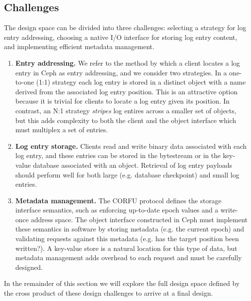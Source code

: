 \documentclass[10pt,twocolumn]{article}
\begin{document}
\subsection{Challenges}

The design space can be divided into three challenges: selecting a strategy
for log entry addressing, choosing a native I/O interface for storing log
entry content, and implementing efficient metadata management.

\begin{enumerate}
    \item {\bf Entry addressing.} We refer to the method by which a client
        locates a log entry in Ceph as entry addressing, and we consider two
        strategies. In a one-to-one (1:1) strategy each log entry is stored in
        a distinct object with a name derived from the associated log entry
        position. This is an attractive option because it is trivial for
        clients to locate a log entry given its position.  In contrast, an N:1
        strategy \emph{stripes} log entires across a smaller set of objects,
        but this adds complexity to both the client and the object interface which
        must multiplex a set of entries.

    \item {\bf Log entry storage.} Clients read and write binary data
        associated with each log entry, and these entries can be stored in the
        bytestream or in the key-value database associated with an object.
        Retrieval of log entry payloads should perform well for both large
        (e.g. database checkpoint) and small log entries.

    \item {\bf Metadata management.} The CORFU protocol defines the storage
        interface semantics, such as enforcing up-to-date epoch values and a
        write-once address space. The object interface constructed in Ceph must
        implement these semantics in software by storing metadata (e.g. the
        current epoch) and validating requests against this metadata (e.g. has
        the target position been written?). A key-value store is a natural
        location for this type of data, but metadata management adds overhead
        to each request and must be carefully designed.
\end{enumerate}

In the remainder of this section we will explore the full design space defined
by the cross product of these design challenges to arrive at a final design.
\end{document}
